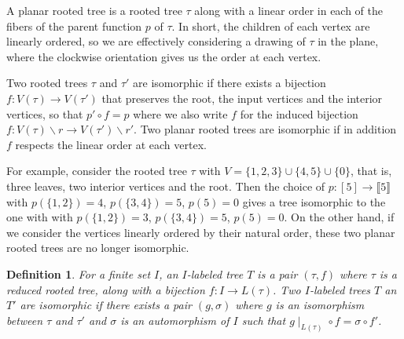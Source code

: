 \documentclass[fleqn,a4paper, twoside]{article}
\newcommand{\0}{\langle 0\rangle}
\DeclareRobustCommand{\[}{\begin{equation}}%
\DeclareRobustCommand{\]}{\end{equation}}%
\theoremstyle{mytheorem}
\theoremstyle{introthm}
\theoremstyle{mydefinition}
\newtheorem{definition}[theorem]{Definition}
\theoremstyle{mydefinition2}
\theoremstyle{plain} %
\newcommand{\?}{\,?\,}
\theoremstyle{mytheorem}
\theoremstyle{plain} %
\begin{document}
A planar rooted tree is a rooted tree $\tau$
along with a linear order in each of the fibers
of the parent function $p$ of $\tau$. In short,
the children of each vertex are linearly ordered,
so we are effectively considering a drawing of
$\tau$ in the plane, where the clockwise
orientation gives us the order at each
vertex. 

Two rooted trees $\tau$ and $\tau'$ are isomorphic
if there exists a bijection $f : V(\tau) \longrightarrow 
V(\tau')$ that preserves the root, the input vertices and the
interior vertices, so that $p'\circ f = p$ where we
also write $f$ for the induced bijection $f : V(\tau)\smallsetminus r \longrightarrow 
V(\tau')\smallsetminus r'$. Two planar rooted trees
are isomorphic if in addition $f$ respects the linear order
at each vertex.

For example, consider the rooted tree $\tau$ with
$V = \{1,2,3\}\cup \{4,5\}\cup \{0\}$, that is,
three leaves, two interior vertices and the root.
Then the choice of $p : [5] \to \llbracket 5 \rrbracket$ 
with $p(\{1,2\}) = 4$, $p(\{3,4\}) = 5$, $p(5) = 0$
gives a tree isomorphic to the one with 
with $p(\{1,2\}) = 3$, $p(\{3,4\}) = 5$, $p(5) = 0$.
On the other hand, if we consider the vertices linearly
ordered by their natural order, these two planar rooted trees 
are no longer isomorphic. 

\begin{definition}
For a finite set $I$, an $I$-labeled tree $T$
is a pair $(\tau,f)$ where $\tau$ is a 
reduced rooted tree, along with
a bijection $f : I \longrightarrow L(\tau)$.
Two $I$-labeled trees $T$ an $T'$ are isomorphic
if there exists a pair $(g,\sigma)$ where
$g$ is an isomorphism between $\tau$ and $\tau'$
and $\sigma$ is an automorphism of $I$ such that
$g\mid_{L(\tau)}\circ f = \sigma\circ f'$. 
\end{definition}
\end{document}
